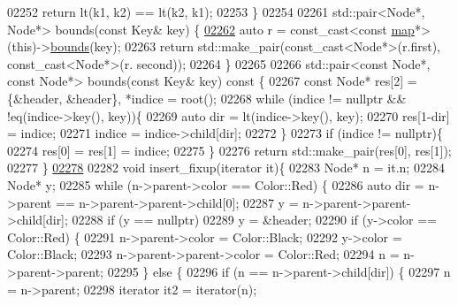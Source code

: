 \begin{DoxyCode}
02252         \textcolor{keywordflow}{return} lt(k1, k2) == lt(k2, k1);
02253     \}
02254 
02261     std::pair<Node*, Node*> bounds(\textcolor{keyword}{const} Key& key) \{
\hypertarget{map_8h_source_l02262}{}\hyperlink{classaed2_1_1map_a4d903414b3f1f1e6f785342bb3900572_a4d903414b3f1f1e6f785342bb3900572}{02262}         \textcolor{keyword}{auto} r = \textcolor{keyword}{const\_cast<}\textcolor{keyword}{const }\hyperlink{classaed2_1_1map}{map}*\textcolor{keyword}{>}(\textcolor{keyword}{this})->\hyperlink{classaed2_1_1map_a4d903414b3f1f1e6f785342bb3900572_a4d903414b3f1f1e6f785342bb3900572}{bounds}(key);
02263         \textcolor{keywordflow}{return} std::make\_pair(const\_cast<Node*>(r.first), const\_cast<Node*>(r.
      second));
02264     \}
02265 
02266     std::pair<const Node*, const Node*> bounds(\textcolor{keyword}{const} Key& key)\textcolor{keyword}{ const }\{
02267         \textcolor{keyword}{const} Node* res[2] = \{&header, &header\}, *indice = root();
02268         \textcolor{keywordflow}{while} (indice != \textcolor{keyword}{nullptr} && !eq(indice->key(), key))\{
02269             \textcolor{keyword}{auto} dir = lt(indice->key(), key);
02270             res[1-dir] = indice;
02271             indice = indice->child[dir];
02272         \}
02273         \textcolor{keywordflow}{if} (indice != \textcolor{keyword}{nullptr})\{
02274             res[0] = res[1] = indice;
02275         \}
02276         \textcolor{keywordflow}{return} std::make\_pair(res[0], res[1]);
02277     \}
\hypertarget{map_8h_source_l02278}{}\hyperlink{classaed2_1_1map_ac9197851fe5b217d45d58bbaf3612c75_ac9197851fe5b217d45d58bbaf3612c75}{02278} 
02282     \textcolor{keywordtype}{void} insert\_fixup(iterator it)\{
02283         Node* n = it.n;
02284         Node* y;
02285         \textcolor{keywordflow}{while} (n->parent->color == Color::Red) \{
02286             \textcolor{keyword}{auto} dir = n->parent == n->parent->parent->child[0];
02287             y = n->parent->parent->child[dir];
02288             \textcolor{keywordflow}{if} (y == \textcolor{keyword}{nullptr})
02289                 y = &header;
02290             \textcolor{keywordflow}{if} (y->color == Color::Red) \{
02291                 n->parent->color = Color::Black;
02292                 y->color = Color::Black;
02293                 n->parent->parent->color = Color::Red;
02294                 n = n->parent->parent;
02295             \} \textcolor{keywordflow}{else} \{
02296                 \textcolor{keywordflow}{if} (n == n->parent->child[dir]) \{
02297                     n = n->parent;
02298                     iterator it2 = iterator(n);

\end{DoxyCode}
